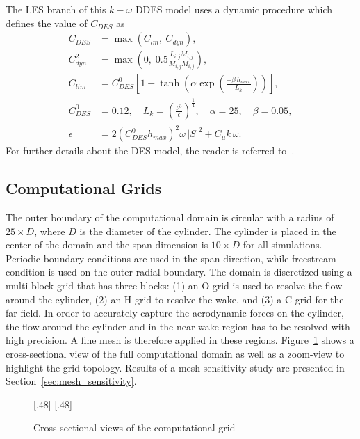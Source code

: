 The LES branch of this $k-\omega$ DDES model uses a dynamic procedure which
defines the value of $C_{DES}$ as
%
\begin{align*}  
  C_{DES}   & =  \max( C_{lm},~C_{dyn} ), \\
  C_{dyn}^2 & = \max \left( 0,\; 0.5 \frac{L_{i,j} M_{i,j}}{M_{i,j} M_{i,j}}\right),\\
  C_{lim}   &=C_{DES}^0 \left[1-\tanh \left(\alpha \exp \left(\frac{-\beta \, h_{max}}{L_k}\right)\right)\right],\\
  C_{DES}^0 &=0.12, \quad   L_k=\left(\frac{\nu^3}{\epsilon}\right)^{\frac{1}{4}},  \quad  \alpha=25,  \quad  \beta=0.05,\\
  \epsilon  &= 2 \left(C_{DES}^0 h_{max} \right)^2 \omega\,|S|^2+C_\mu k\,\omega.
\end{align*}  
%
For further details about the DES model, the reader is referred to~\cite{yin2015dynamic}.


\subsection{Computational Grids}
\label{sec:grids}
%
The outer boundary of the computational domain is circular with a radius of
$25\times D$, where $D$ is the diameter of the cylinder. The cylinder is placed
in the center of the domain and the span dimension is $10\times D$ for all
simulations. Periodic boundary conditions are used in the span direction, while
freestream condition is used on the outer radial boundary. The domain is
discretized using a multi-block grid that has three blocks: (1) an O-grid is
used to resolve the flow around the cylinder, (2) an H-grid to resolve the
wake, and (3) a C-grid for the far field. In order to accurately capture the
aerodynamic forces on the cylinder, the flow around the cylinder and in the
near-wake region has to be resolved with high precision. A fine mesh is
therefore applied in these regions.  Figure~\ref{fig:Mesh} shows a
cross-sectional view of the full computational domain as well as a zoom-view to
highlight the grid topology. Results of a mesh sensitivity study are presented
in Section~\ref{sec:mesh_sensitivity}.
%
\begin{figure}[htb!]
  \centering
    [.48\linewidth]{}
  \hspace*{\fill}
    [.48\linewidth]{}
  \caption{Cross-sectional views of the computational grid}
  \label{fig:Mesh}
\end{figure}

